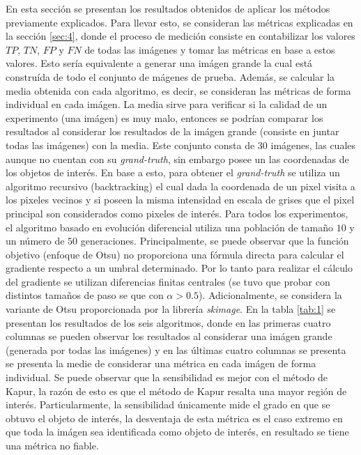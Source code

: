 \documentclass[preprint,12pt]{elsarticle}
\begin{document}
En esta sección se presentan los resultados obtenidos de aplicar los métodos previamente explicados.
%
Para llevar esto, se consideran las métricas explicadas en la sección \ref{sec:4}, donde el proceso de medición consiste en contabilizar los valores $TP$, $TN$, $FP$ y $FN$ de todas las imágenes y tomar las métricas en base a estos valores.
%
Esto sería equivalente a generar una imágen grande la cual está construída de todo el conjunto de mágenes de prueba.
%
Además, se calcular la media obtenida con cada algoritmo, es decir, se consideran las métricas de forma individual en cada imágen.
%
La media sirve para verificar si la calidad de un experimento (una imágen) es muy malo, entonces se podrían comparar los  resultados al considerar los resultados de la imágen grande (consiste en juntar todas las imágenes) con la media.
%
Este conjunto consta de $30$ imágenes, las cuales aunque no cuentan con su \textit{grand-truth}, sin embargo posee un las coordenadas de los objetos de  interés.
%
En base a esto, para obtener el \textit{grand-truth} se utiliza un algoritmo recursivo (backtracking) el cual dada la coordenada de un pixel visita a los pixeles vecinos y si poseen la misma intensidad en escala de grises  que el pixel principal son considerados como pixeles de interés.
%
Para todos los experimentos, el algoritmo basado en evolución diferencial utiliza una población de tamaño $10$ y un número  de $50$ generaciones.
%
Principalmente, se puede observar que la función objetivo (enfoque de Otsu) no proporciona una fórmula directa para calcular el gradiente respecto a un umbral determinado.
%
Por lo tanto para realizar el cálculo del gradiente se utilizan diferencias finitas centrales (se tuvo que probar con distintos tamaños de paso se que con $\alpha > 0.5$).
%
Adicionalmente, se considera la variante de Otsu proporcionada por la librería \textit{skimage}.
%
En la tabla \ref{tab:1} se presentan los resultados de los seis algoritmos, donde en las primeras cuatro columnas se pueden observar los resultados al considerar una imágen grande (generada por todas las imágenes) y en las últimas cuatro columnas se presenta se presenta la medie de considerar una métrica en cada imágen de forma individual.
%
Se puede observar que la sensibilidad es mejor con el método de Kapur, la razón de esto es que el método de Kapur resalta una mayor región de interés.
%
Particularmente, la sensibilidad únicamente mide el grado en que se obtuvo el objeto de interés, la desventaja de esta métrica es el caso extremo en que toda la  imágen sea identificada como objeto de interés, en resultado se tiene una métrica no fiable.
\end{document}
